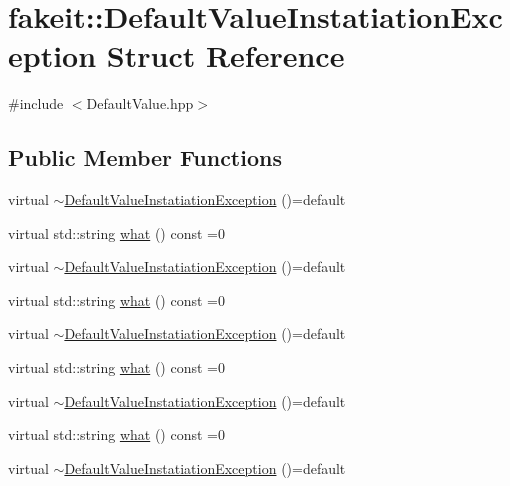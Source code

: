 \hypertarget{structfakeit_1_1DefaultValueInstatiationException}{}\section{fakeit\+::Default\+Value\+Instatiation\+Exception Struct Reference}
\label{structfakeit_1_1DefaultValueInstatiationException}


{\ttfamily \#include $<$Default\+Value.\+hpp$>$}

\subsection*{Public Member Functions}
\begin{DoxyCompactItemize}
\item 
virtual \mbox{\hyperlink{structfakeit_1_1DefaultValueInstatiationException_ac3ca7aace218927f9e3bed6dfa54d672}{$\sim$\+Default\+Value\+Instatiation\+Exception}} ()=default
\item 
virtual std\+::string \mbox{\hyperlink{structfakeit_1_1DefaultValueInstatiationException_a64d51af8601b672a5300c38a91b0b44d}{what}} () const =0
\item 
virtual \mbox{\hyperlink{structfakeit_1_1DefaultValueInstatiationException_ac3ca7aace218927f9e3bed6dfa54d672}{$\sim$\+Default\+Value\+Instatiation\+Exception}} ()=default
\item 
virtual std\+::string \mbox{\hyperlink{structfakeit_1_1DefaultValueInstatiationException_a64d51af8601b672a5300c38a91b0b44d}{what}} () const =0
\item 
virtual \mbox{\hyperlink{structfakeit_1_1DefaultValueInstatiationException_ac3ca7aace218927f9e3bed6dfa54d672}{$\sim$\+Default\+Value\+Instatiation\+Exception}} ()=default
\item 
virtual std\+::string \mbox{\hyperlink{structfakeit_1_1DefaultValueInstatiationException_a64d51af8601b672a5300c38a91b0b44d}{what}} () const =0
\item 
virtual \mbox{\hyperlink{structfakeit_1_1DefaultValueInstatiationException_ac3ca7aace218927f9e3bed6dfa54d672}{$\sim$\+Default\+Value\+Instatiation\+Exception}} ()=default
\item 
virtual std\+::string \mbox{\hyperlink{structfakeit_1_1DefaultValueInstatiationException_a64d51af8601b672a5300c38a91b0b44d}{what}} () const =0
\item 
virtual \mbox{\hyperlink{structfakeit_1_1DefaultValueInstatiationException_ac3ca7aace218927f9e3bed6dfa54d672}{$\sim$\+Default\+Value\+Instatiation\+Exception}} ()=default

\end{DoxyCompactItemize}
